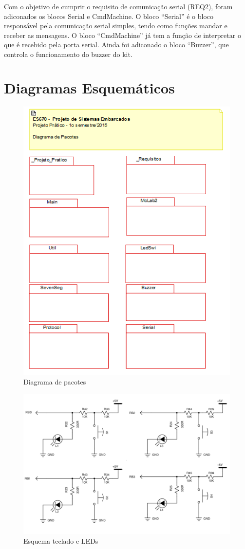 \documentclass{article}
\begin{document}
Com o objetivo de cumprir o requisito de comunicação serial (REQ2), foram adiconados os blocos Serial e CmdMachine. O bloco ``Serial'' é o bloco responsável pela comunicação serial simples, tendo como funções mandar e receber as mensagens. O bloco ``CmdMachine'' já tem a função de interpretar o que é recebido pela porta serial. Ainda foi adiconado o bloco ``Buzzer'', que controla o funcionamento do buzzer do kit.

\section{Diagramas Esquemáticos}

\begin{figure}[H]
	\centering
	\includegraphics{pacotes}
	\caption{Diagrama de pacotes}
	\label{fig:pacotes}
\end{figure}
\begin{figure}[H]
	\centering
	\includegraphics[width=0.7\linewidth]{esq_ledswi}
	\caption{Esquema teclado e LEDs}
	\label{fig:esq_ledswi}
\end{figure}
\end{document}
